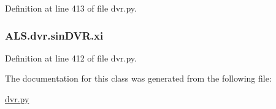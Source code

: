 Definition at line 413 of file dvr.\+py.

\hypertarget{class_a_l_s_1_1dvr_1_1sin_d_v_r_ac38a455f10cba07aa10267031ba63660}{
\subsubsection[{xi}]{\setlength{\rightskip}{0pt plus 5cm}A\+L\+S.\+dvr.\+sin\+D\+V\+R.\+xi}}\label{class_a_l_s_1_1dvr_1_1sin_d_v_r_ac38a455f10cba07aa10267031ba63660}


Definition at line 412 of file dvr.\+py.



The documentation for this class was generated from the following file\+:\begin{DoxyCompactItemize}
\item 
\hyperlink{dvr_8py}{dvr.\+py}\end{DoxyCompactItemize}
